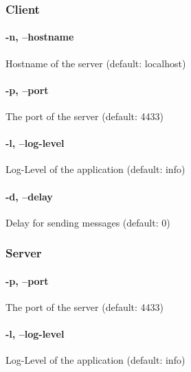 \documentclass[12pt, letterpaper]{article}
\begin{document}
\subsubsection{Client}

\paragraph{-n, --hostname}
Hostname of the server (default: localhost)


\paragraph{-p, --port}
The port of the server (default: 4433)

\paragraph{-l, --log-level}
Log-Level of the application (default: info)

\paragraph{-d, --delay}
Delay for sending messages (default: 0)


\subsubsection{Server}


\paragraph{-p, --port}
The port of the server (default: 4433)

\paragraph{-l, --log-level}
Log-Level of the application (default: info)
\end{document}
